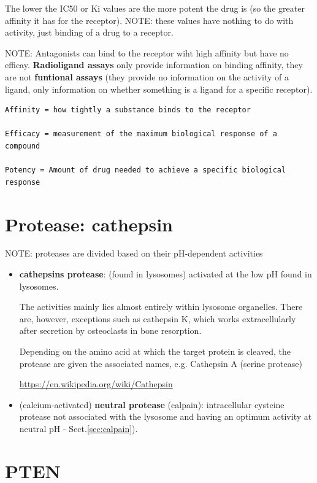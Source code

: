The lower the IC50 or Ki values are the more potent the drug is (so the greater
affinity it has for the receptor). NOTE: these values have nothing to do with
activity, just binding of a drug to a receptor.

NOTE:  Antagonists can bind to the receptor wiht high affinity but have no
efficay. {\bf Radioligand assays} only provide information on binding affinity,
they are not {\bf funtional assays} (they provide no information on the activity
of a ligand, only information on whether something is a ligand for a specific
receptor).   

\begin{verbatim}
Affinity = how tightly a substance binds to the receptor

Efficacy = measurement of the maximum biological response of a compound

Potency = Amount of drug needed to achieve a specific biological response
\end{verbatim}


\section{Protease: cathepsin}
\label{sec:protease}
\label{sec:cathepsin}

NOTE: proteases are divided based on their pH-dependent activities
\begin{itemize}
  \item {\bf cathepsins protease}: (found in lysosomes) activated at the low pH
  found in lysosomes.

The activities mainly lies almost entirely within lysosome organelles.
There are, however, exceptions such as cathepsin K, which works extracellularly
after secretion by osteoclasts in bone resorption.

Depending on the amino acid at which the target protein is cleaved, the protease
are given the associated names, e.g. Cathepsin A (serine protease)

\url{https://en.wikipedia.org/wiki/Cathepsin}

  \item (calcium-activated) {\bf neutral protease} (calpain):
  intracellular cysteine protease not associated with the lysosome and having an
  optimum activity at neutral pH - Sect.\ref{sec:calpain}).
  
\end{itemize}

\section{PTEN}
\label{sec:PTEN}

